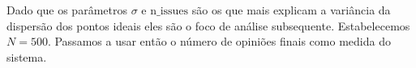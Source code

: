 Dado que os parâmetros \(\sigma\) e \(\text{n\_issues}\) são os que mais explicam a
variância da dispersão dos pontos ideais eles são o foco de análise subsequente.
Estabelecemos \(N = 500\). Passamos a usar então o número de opiniões finais
como medida do sistema. 














